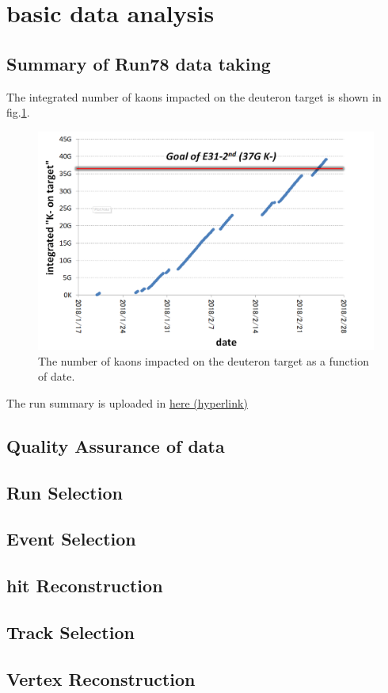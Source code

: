 \section{basic data analysis}
\subsection{Summary of Run78 data taking}
The integrated number of kaons impacted on the deuteron target is shown in fig.\ref{fig:integral}.

\begin{figure}
\includegraphics[width=0.95\linewidth]{fig/integratedlumi}
\caption{The number of kaons impacted on the deuteron target as a function of date.}
\label{fig:integral}
\end{figure}

The run summary is uploaded in \href{http://ag.riken.jp/J-PARC/RunSummary/RunSummary_run78.xlsx}{here (hyperlink)}


\subsection{Quality Assurance of data}


\subsection{Run Selection}

\subsection{Event Selection}


\subsection{hit Reconstruction}


\subsection{Track Selection}


\subsection{Vertex Reconstruction}



